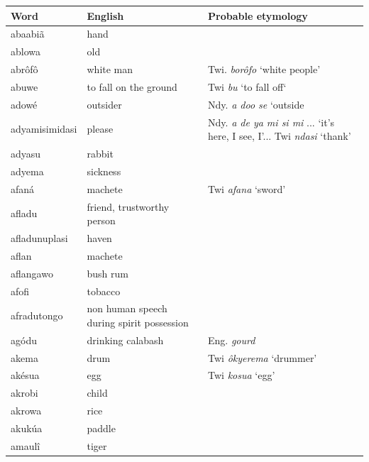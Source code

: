     \noindent\begin{longtable}[c]{ p{} p{} p{} }
    \hline
    Word            & English       & Probable etymology  \\
    \hline\endhead
    abaabiã         & hand          &  \\
    ablowa          & old           &  \\
    abrôfô          & white man     & Twi. \textit{borôfo} `white people'  \\
    abuwe           & to fall on the ground%
                                    & Twi \textit{bu} `to fall off`  \\
    adowé           & outsider      & Ndy. \textit{a doo se} `outside \\
    adyamisimidasi  & please        & Ndy. \textit{a de ya mi si mi} ... `it’s here, I see, I'...%
                                      Twi \textit{ndasi} `thank'  \\
    adyasu          & rabbit        &  \\
    adyema          & sickness      &  \\
    afaná           & machete       & Twi \textit{afana} `sword'  \\
    afladu          & friend,%
                      trustworthy person%
                                    &  \\
    afladunuplasi   & haven         &  \\
    aflan           & machete       &  \\
    aflangawo       & bush rum      &  \\
    afofi           & tobacco       &  \\
    afradutongo     & non human speech during spirit possession%
                                    &  \\
    agódu           & drinking calabash%
                                    & Eng. \textit{gourd}  \\
    akema           & drum          & Twi \textit{ôkyerema} `drummer'  \\
    akésua          & egg           & Twi \textit{kosua} `egg'  \\
    akrobi          & child         &  \\
    akrowa          & rice          &  \\
    akukúa          & paddle        &  \\
    amaulî          & tiger         &  \\

\end{longtable}

